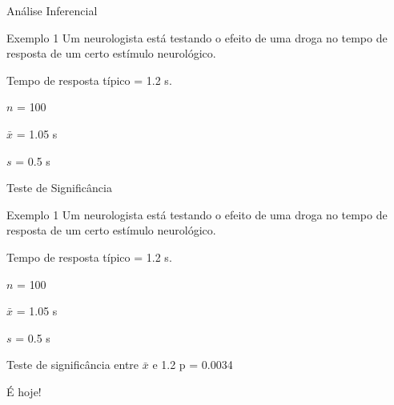 \documentclass{beamer}
\begin{document}
\begin{frame}{\scriptsize Análise Inferencial}
  \begin{exampleblock}{Exemplo 1}
    \scriptsize
    Um neurologista está testando o efeito de uma droga no tempo de
    resposta de um certo estímulo neurológico.

    \smallskip
    Tempo de resposta típico = \alert<2->{1.2 s}.

    \smallskip
    $n$ = \alert{100}

    $\bar{x}$ = \alert{1.05 s}

    $s$ = \alert{0.5 s}

  \end{exampleblock}
\end{frame}

\begin{frame}{\scriptsize Teste de Significância}
  \begin{exampleblock}{Exemplo 1}
    \footnotesize
    Um neurologista está testando o efeito de uma droga no tempo de
    resposta de um certo estímulo neurológico.

    \smallskip
    Tempo de resposta típico = \alert{1.2 s}.

    \smallskip
    $n$ = \alert{100}

    $\bar{x}$ = \alert{1.05 s}

    $s$ = \alert{0.5 s}
  \end{exampleblock}
  \begin{exampleblock}{Teste de significância entre $\bar{x}$ e 1.2}
    \footnotesize
    p = 0.0034
  \end{exampleblock}
  \begin{center}
    \small
    É hoje!
  \end{center}
\end{frame}
\end{document}
